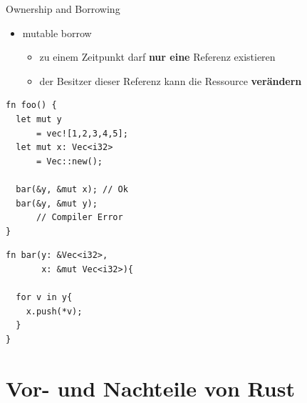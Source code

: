 \documentclass{beamer}
\begin{document}
\begin{frame}[fragile]{Ownership and Borrowing}
	\begin{itemize}
	    \item mutable borrow  
	    \begin{itemize}
	        \item zu einem Zeitpunkt darf \textbf{nur eine} Referenz existieren      
	        \item der Besitzer dieser Referenz kann die Ressource \textbf{verändern}
	        \pause
	    \end{itemize}
	\end{itemize}
\begin{center}
\hspace{3pt}
\begin{minipage}[t]{.48\textwidth}
\begin{lstlisting}
fn foo() {	
  let mut y 
      = vec![1,2,3,4,5];
  let mut x: Vec<i32> 
      = Vec::new();
		
  bar(&y, &mut x); // Ok
  bar(&y, &mut y); 
      // Compiler Error
}
\end{lstlisting}				
\end{minipage}
\hspace{3pt}
\begin{minipage}[t]{.47\textwidth}
\begin{lstlisting}
fn bar(y: &Vec<i32>, 
       x: &mut Vec<i32>){
	
  for v in y{
    x.push(*v);
  }
}
\end{lstlisting}				
\end{minipage}
\end{center}
\end{frame}

\section{Vor- und Nachteile von Rust}
\end{document}
